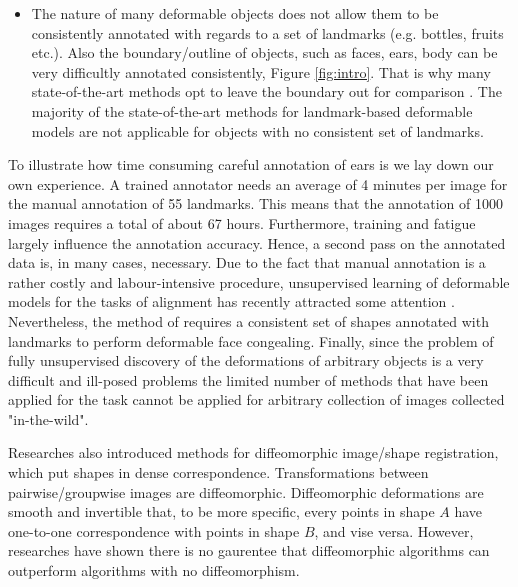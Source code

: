 \begin{itemize}
\item The nature of many deformable objects does not allow them to be consistently annotated with regards to a set of landmarks (e.g. bottles, fruits etc.). Also the boundary/outline of objects, such as faces, ears, body can be very difficultly annotated consistently, Figure \ref{fig:intro}. That is why many state-of-the-art methods opt to leave the boundary out for comparison \cite{Tzimiropoulos2014, Asthana2014}. The majority of the state-of-the-art methods for landmark-based deformable models \cite{Cao2012, Zhu2012, Xiong2013, Tzimiropoulos2014, Asthana2014} are not applicable for objects with no consistent set of landmarks. 

\end{itemize}

To illustrate how time consuming careful annotation of ears is we lay down our own experience. A trained annotator needs an average of 4 minutes per image for the manual annotation of 55 landmarks. This means that the annotation of 1000 images requires a total of about 67 hours. 
Furthermore, training and fatigue largely influence the annotation accuracy. Hence, a second pass on the annotated data is, in many cases, necessary. Due to the fact that manual annotation is a rather costly and labour-intensive procedure, unsupervised learning of deformable models for the tasks of alignment has recently attracted some attention \cite{kokkinos2007unsupervised,jojic2006escaping,jiang2009learning,liu2009simultaneous,baker2004automatic,cox2008least,cootes2004groupwise,frey2003learning}. Nevertheless, the method of \cite{antonakos2014automatic} requires a consistent set of shapes annotated with landmarks to perform deformable face congealing. Finally, since the problem of fully unsupervised discovery of the deformations of arbitrary objects is a very difficult and ill-posed problems the limited number of methods that have been applied for the task cannot be applied for arbitrary collection of images collected "in-the-wild". 

Researches \cite{cootes2004groupwise,cootes2004diffeomorphic,cootes2010computing,rueckert2006diffeomorphic,rueckert1999nonrigid,koelstra2010dynamic} also introduced methods for diffeomorphic image/shape registration, which put shapes in dense correspondence. Transformations between pairwise/groupwise images are diffeomorphic. Diffeomorphic deformations are smooth and invertible that, to be more specific, every points in shape $A$ have one-to-one correspondence with points in shape $B$, and vise versa. However, researches have shown there is no gaurentee that diffeomorphic algorithms can outperform algorithms with no diffeomorphism\cite{crum2004framework}.

